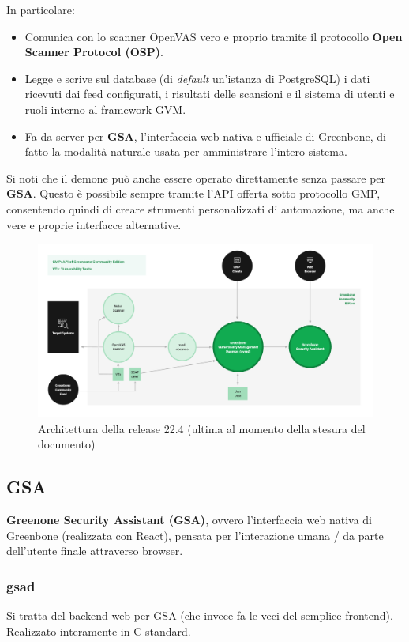 In particolare:
\begin{itemize}
    \item Comunica con lo scanner OpenVAS vero e proprio tramite il protocollo \textbf{Open Scanner Protocol (OSP)}.
    \item Legge e scrive sul database (di \emph{default} un'istanza di PostgreSQL) i dati ricevuti dai feed configurati, i risultati delle scansioni e il sistema di utenti e ruoli interno al framework GVM.
    \item Fa da server per \textbf{GSA}, l'interfaccia web nativa e ufficiale di Greenbone, di fatto la modalità naturale usata per amministrare l'intero sistema.
\end{itemize}

Si noti che il demone può anche essere operato direttamente senza passare per \textbf{GSA}. Questo è possibile sempre tramite l'API offerta sotto protocollo GMP, consentendo quindi di creare strumenti personalizzati di automazione, ma anche vere e proprie interfacce alternative.

\begin{figure}
    \includegraphics[width=\textwidth]{img/greenbone-community-22.4-architecture.png}
    \caption{Architettura della release 22.4 (ultima al momento della stesura del documento)}
\end{figure}

\subsection{GSA}
\textbf{Greenone Security Assistant (GSA)}, ovvero l'interfaccia web nativa di Greenbone (realizzata con React), pensata per l'interazione umana / da parte dell'utente finale attraverso browser.

\subsubsection{gsad}
Si tratta del backend web per GSA (che invece fa le veci del semplice frontend). Realizzato interamente in C standard.

